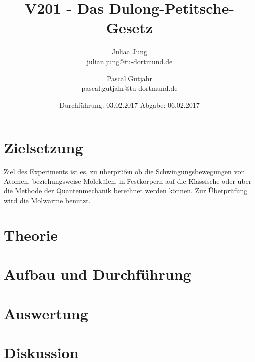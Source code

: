 

\title{V201 - Das Dulong-Petitsche-Gesetz}
\author{Julian Jung \\ julian.jung@tu-dortmund.de
  \and Pascal Gutjahr \\ pascal.gutjahr@tu-dortmund.de}
  \date{Durchführung: 03.02.2017
  \hspace{3em}
  Abgabe: 06.02.2017}
  
\maketitle
\newpage
\tableofcontents
\newpage
\section{Zielsetzung}
Ziel des Experiments ist es, zu überprüfen ob die Schwingungsbewegungen von
Atomen, beziehungsweise Molekülen, in Festkörpern auf die Klassische oder über
die Methode der Quantenmechanik berechnet werden können. Zur Überprüfung wird
die Molwärme benutzt.
\section{Theorie}
 
\section{Aufbau und Durchführung}
 
\section{Auswertung}
 
 \newpage
\section{Diskussion}
 
\printbibliography

